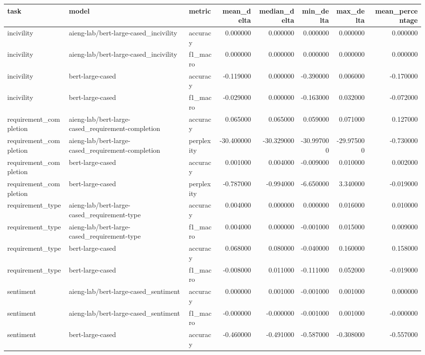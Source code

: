 \begin{tabular}{lllrrrrr}
\toprule
task & model & metric & mean_delta & median_delta & min_delta & max_delta & mean_percentage \\
\midrule
incivility & aieng-lab/bert-large-cased_incivility & accuracy & 0.000000 & 0.000000 & 0.000000 & 0.000000 & 0.000000 \\
incivility & aieng-lab/bert-large-cased_incivility & f1_macro & 0.000000 & 0.000000 & 0.000000 & 0.000000 & 0.000000 \\
incivility & bert-large-cased & accuracy & -0.119000 & 0.000000 & -0.390000 & 0.006000 & -0.170000 \\
incivility & bert-large-cased & f1_macro & -0.029000 & 0.000000 & -0.163000 & 0.032000 & -0.072000 \\
requirement_completion & aieng-lab/bert-large-cased_requirement-completion & accuracy & 0.065000 & 0.065000 & 0.059000 & 0.071000 & 0.127000 \\
requirement_completion & aieng-lab/bert-large-cased_requirement-completion & perplexity & -30.400000 & -30.329000 & -30.997000 & -29.975000 & -0.730000 \\
requirement_completion & bert-large-cased & accuracy & 0.001000 & 0.004000 & -0.009000 & 0.010000 & 0.002000 \\
requirement_completion & bert-large-cased & perplexity & -0.787000 & -0.994000 & -6.650000 & 3.340000 & -0.019000 \\
requirement_type & aieng-lab/bert-large-cased_requirement-type & accuracy & 0.004000 & 0.000000 & 0.000000 & 0.016000 & 0.010000 \\
requirement_type & aieng-lab/bert-large-cased_requirement-type & f1_macro & 0.004000 & 0.000000 & -0.001000 & 0.015000 & 0.009000 \\
requirement_type & bert-large-cased & accuracy & 0.068000 & 0.080000 & -0.040000 & 0.160000 & 0.158000 \\
requirement_type & bert-large-cased & f1_macro & -0.008000 & 0.011000 & -0.111000 & 0.052000 & -0.019000 \\
sentiment & aieng-lab/bert-large-cased_sentiment & accuracy & 0.000000 & 0.001000 & -0.001000 & 0.001000 & 0.000000 \\
sentiment & aieng-lab/bert-large-cased_sentiment & f1_macro & -0.000000 & -0.000000 & -0.001000 & 0.001000 & -0.000000 \\
sentiment & bert-large-cased & accuracy & -0.460000 & -0.491000 & -0.587000 & -0.308000 & -0.557000 \\

\end{tabular}
